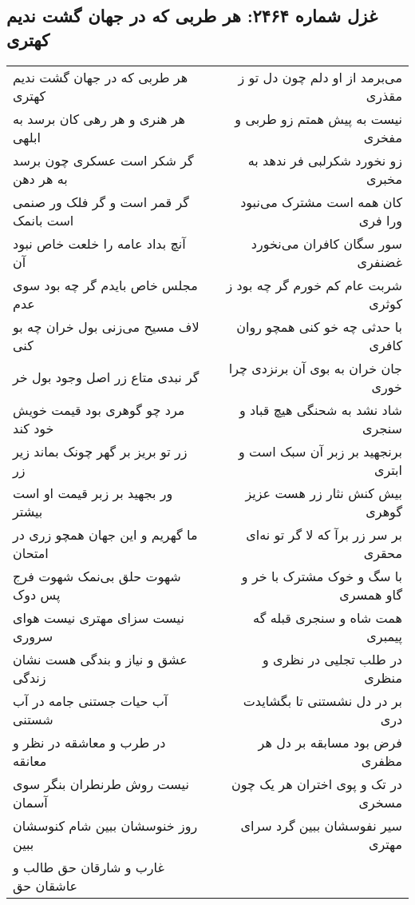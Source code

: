 \begin{center}
\section*{غزل شماره ۲۴۶۴: هر طربی که در جهان گشت ندیم کهتری}
\label{sec:2464}
\begin{longtable}{l p{0.5cm} r}
هر طربی که در جهان گشت ندیم کهتری
&&
می‌برمد از او دلم چون دل تو ز مقذری
\\
هر هنری و هر رهی کان برسد به ابلهی
&&
نیست به پیش همتم زو طربی و مفخری
\\
گر شکر است عسکری چون برسد به هر دهن
&&
زو نخورد شکرلبی فر ندهد به مخبری
\\
گر قمر است و گر فلک ور صنمی است بانمک
&&
کان همه است مشترک می‌نبود ورا فری
\\
آنچ بداد عامه را خلعت خاص نبود آن
&&
سور سگان کافران می‌نخورد غضنفری
\\
مجلس خاص بایدم گر چه بود سوی عدم
&&
شربت عام کم خورم گر چه بود ز کوثری
\\
لاف مسیح می‌زنی بول خران چه بو کنی
&&
با حدثی چه خو کنی همچو روان کافری
\\
گر نبدی متاع زر اصل وجود بول خر
&&
جان خران به بوی آن برنزدی چرا خوری
\\
مرد چو گوهری بود قیمت خویش خود کند
&&
شاد نشد به شحنگی هیچ قباد و سنجری
\\
زر تو بریز بر گهر چونک بماند زیر زر
&&
برنجهید بر زبر آن سبک است و ابتری
\\
ور بجهید بر زبر قیمت او است بیشتر
&&
بیش کنش نثار زر هست عزیز گوهری
\\
ما گهریم و این جهان همچو زری در امتحان
&&
بر سر زر برآ که لا گر تو نه‌ای محقری
\\
شهوت حلق بی‌نمک شهوت فرج پس دوک
&&
با سگ و خوک مشترک با خر و گاو همسری
\\
نیست سزای مهتری نیست هوای سروری
&&
همت شاه و سنجری قبله گه پیمبری
\\
عشق و نیاز و بندگی هست نشان زندگی
&&
در طلب تجلیی در نظری و منظری
\\
آب حیات جستنی جامه در آب شستنی
&&
بر در دل نشستنی تا بگشایدت دری
\\
در طرب و معاشقه در نظر و معانقه
&&
فرض بود مسابقه بر دل هر مظفری
\\
نیست روش طرنطران بنگر سوی آسمان
&&
در تک و پوی اختران هر یک چون مسخری
\\
روز خنوسشان ببین شام کنوسشان ببین
&&
سیر نفوسشان ببین گرد سرای مهتری
\\
غارب و شارقان حق طالب و عاشقان حق

\end{longtable}
\end{center}
